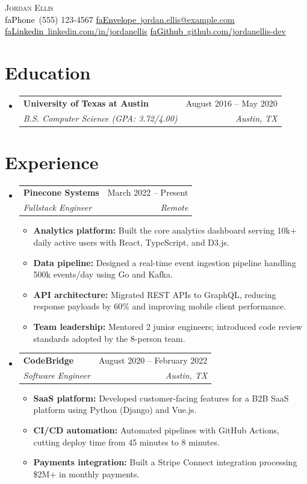 \documentclass[letterpaper,11pt]{article}
\makeatletter
\newcommand{\resumeItem}[1]{\item\small{{#1 \vspace{-2pt}}}}
\newcommand{\resumeSubheading}[4]{
  \vspace{-4pt}\item
    \begin{tabular*}{0.97\textwidth}[t]{l@{\extracolsep{\fill}}r}
      \textbf{#1} & #2 \\
      \textit{\small#3} & \textit{\small #4} \\
    \end{tabular*}\vspace{-10pt}
}
\newcommand{\resumeSubHeadingListStart}{\begin{itemize}[leftmargin=0.15in, label={}]}
\newcommand{\resumeSubHeadingListEnd}{\end{itemize}}
\newcommand{\resumeItemListStart}{\begin{itemize}[leftmargin=0.15in]}
\newcommand{\resumeItemListEnd}{\end{itemize}\vspace{-5pt}}
\newcommand{\seticon}[1]{\textcolor{Black}{\csname #1\endcsname}}
\makeatother
\begin{document}
\begin{center}
  {\Huge \scshape Jordan Ellis}\\\vspace{4pt}
  \small
  \seticon{faPhone}\ (555) 123-4567 \quad
  \href{mailto:jordan.ellis@example.com}{\seticon{faEnvelope}\ \underline{jordan.ellis@example.com}} \quad
  \href{https://linkedin.com/in/jordanellis}{\seticon{faLinkedin}\ \underline{linkedin.com/in/jordanellis}} \quad
  \href{https://github.com/jordanellis-dev}{\seticon{faGithub}\ \underline{github.com/jordanellis-dev}}
\end{center}

\section{Education}
\resumeSubHeadingListStart
  \resumeSubheading
    {University of Texas at Austin}{August 2016 -- May 2020}
    {B.S. Computer Science (GPA: 3.72/4.00)}{Austin, TX}
\resumeSubHeadingListEnd

\section{Experience}
\resumeSubHeadingListStart
  \resumeSubheading
    {Pinecone Systems}{March 2022 -- Present}
    {Fullstack Engineer}{Remote}
    \resumeItemListStart
      \resumeItem{\textbf{Analytics platform:} Built the core analytics dashboard serving 10k+ daily active users with React, TypeScript, and D3.js.}
      \resumeItem{\textbf{Data pipeline:} Designed a real-time event ingestion pipeline handling 500k events/day using Go and Kafka.}
      \resumeItem{\textbf{API architecture:} Migrated REST APIs to GraphQL, reducing response payloads by 60\% and improving mobile client performance.}
      \resumeItem{\textbf{Team leadership:} Mentored 2 junior engineers; introduced code review standards adopted by the 8-person team.}
    \resumeItemListEnd

  \resumeSubheading
    {CodeBridge}{August 2020 -- February 2022}
    {Software Engineer}{Austin, TX}
    \resumeItemListStart
      \resumeItem{\textbf{SaaS platform:} Developed customer-facing features for a B2B SaaS platform using Python (Django) and Vue.js.}
      \resumeItem{\textbf{CI/CD automation:} Automated pipelines with GitHub Actions, cutting deploy time from 45 minutes to 8 minutes.}
      \resumeItem{\textbf{Payments integration:} Built a Stripe Connect integration processing \$2M+ in monthly payments.}
    \resumeItemListEnd
\resumeSubHeadingListEnd
\end{document}
